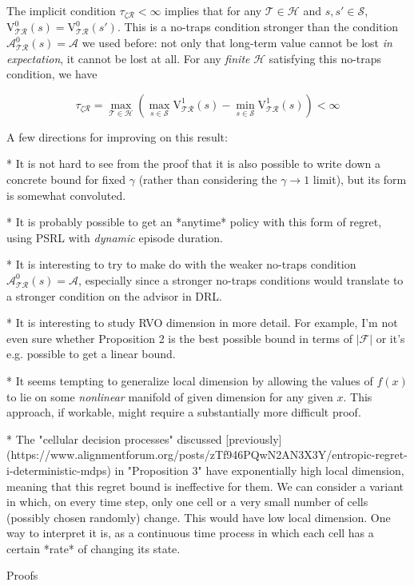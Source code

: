 \documentclass[a4paper]{article}
\newcommand{\Co}[1]{}
\newcommand{\AP}[1]{\left(#1\right)}
\newcommand{\Abs}[1]{\left\vert #1 \right\vert}
\newcommand{\F}{\mathcal{F}}
\newcommand{\St}{\mathcal{S}}
\newcommand{\A}{\mathcal{A}}
\newcommand{\R}{\mathcal{R}}
\newcommand{\T}{\mathcal{T}}
\newcommand{\Hy}{\mathcal{H}}
\newcommand{\V}{\mathrm{V}}
\begin{document}
The implicit condition $\tau_{\zeta\R}<\infty$ implies that for any $\T\in\Hy$ and $s,s'\in\St$, $\V_{\T\R}^0(s)=\V_{\T\R}^0\AP{s'}$. This is a no-traps condition stronger than the condition $\A^0_{\T\R}(s) = \A$ we used before: not only that long-term value cannot be lost \textit{in expectation}\Co{i}, it cannot be lost at all. For any \textit{finite}\Co{i} $\Hy$ satisfying this no-traps condition, we have

$$\tau_{\zeta\R}=\max_{\T\in\Hy}\AP{\max_{s\in\St}{\V^1_{\T\R}(s)}-\min_{s\in\St}{\V^1_{\T\R}(s)}}<\infty$$

A few directions for improving on this result:

* It is not hard to see from the proof that it is also possible to write down a concrete bound for fixed $\gamma$ (rather than considering the $\gamma\rightarrow 1$ limit), but its form is somewhat convoluted.

* It is probably possible to get an *anytime* policy with this form of regret, using PSRL with \textit{dynamic}\Co{i} episode duration.

* It is interesting to try to make do with the weaker no-traps condition $\A^0_{\T\R}(s) = \A$, especially since a stronger no-traps conditions would translate to a stronger condition on the advisor in DRL.

* It is interesting to study RVO dimension in more detail. For example, I'm not even sure whether Proposition 2 is the best possible bound in terms of $\Abs{\F}$ or it's e.g. possible to get a linear bound.

* It seems tempting to generalize local dimension by allowing the values of $f(x)$ to lie on some \textit{nonlinear} manifold of given dimension for any given $x$. This approach, if workable, might require a substantially more difficult proof.

* The "cellular decision processes" discussed [previously](https://www.alignmentforum.org/posts/zTf946PQwN2AN3X3Y/entropic-regret-i-deterministic-mdps) in "Proposition 3" have exponentially high local dimension, meaning that this regret bound is ineffective for them. We can consider a variant in which, on every time step, only one cell or a very small number of cells (possibly chosen randomly) change. This would have low local dimension. One way to interpret it is, as a continuous time process in which each cell has a certain *rate* of changing its state.

\begin{Huge}Proofs\end{Huge}
\end{document}
